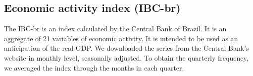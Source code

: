 \subsection{Economic activity index (IBC-br)}
The IBC-br is an index calculated by the Central Bank of Brazil. It is an aggregate of 21 variables of economic activity. It is intended to be used as an anticipation of the real GDP. We downloaded the series from the Central Bank's website in monthly level, seasonally adjusted. To obtain the quarterly frequency, we averaged the index through the months in each quarter.